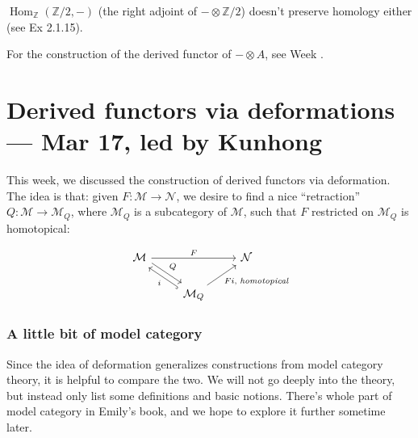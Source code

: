 \documentclass[11pt]{article}
\theoremstyle{definition}
\theoremstyle{remark}
\newcommand{\Hom}{\operatorname{Hom}}
\newcommand{\bZ}{\mathbb Z}
\newcommand{\calM}{\mathcal{M}}
\newcommand{\calN}{\mathcal{N}}
\begin{document}
$\Hom_{\bZ}(\bZ/2, -)$ (the right adjoint of $-\otimes \bZ/2$) doesn't preserve homology either (see Ex 2.1.15).

For the construction of the derived functor of $-\otimes A$, see Week \ref{part-3}.

\newpage
\part{Derived functors via deformations --- Mar 17, led by Kunhong}
\label{part-3}
\setcounter{section}{0}

This week, we discussed the construction of derived functors via deformation.
The idea is that: given $F : \calM \to \calN$, we desire to find
a nice ``retraction'' $Q : \calM \to \calM_Q$, where $\calM_Q$ is a subcategory of $\calM$,
such that $F$ restricted on $\calM_Q$ is homotopical:

\[
\begin{tikzcd}
    \calM \arrow[dr, shift left=1, "Q"] \arrow[rr, "F"] & & \calN \\
    & \calM_Q \arrow[ul, shift left=1, hookrightarrow, "i"] \arrow[ur, "Fi \text{, \emph{homotopical}}"'] &
\end{tikzcd}
\]

\section{A little bit of model category}
Since the idea of deformation generalizes constructions from model category theory, 
it is helpful to compare the two. We will not go deeply into the theory, 
but instead only list some definitions and basic notions.
There's whole part of model category in Emily's book, and we hope to explore it further sometime later.
\end{document}
